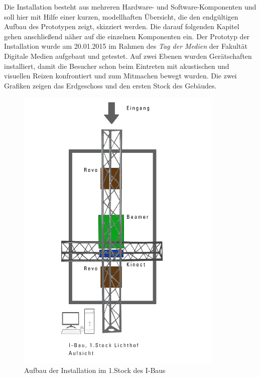 
Die Installation besteht aus mehreren Hardware- und Software-Komponenten und soll hier mit Hilfe einer kurzen, modellhaften Übersicht, die den endgültigen Aufbau des Prototypen zeigt, skizziert werden. Die darauf folgenden Kapitel gehen anschließend näher auf die einzelnen Komponenten ein. Der Prototyp der Installation wurde am 20.01.2015 im Rahmen des \textit{Tag der Medien} der Fakultät Digitale Medien aufgebaut und getestet. Auf zwei Ebenen wurden Gerätschaften installiert, damit die Besucher schon beim Eintreten mit akustischen und visuellen Reizen konfrontiert und zum Mitmachen bewegt wurden. Die zwei Grafiken zeigen das Erdgeschoss und den ersten Stock des Gebäudes.
\begin{figure}[htbp]
	\centering
		\includegraphics[width=0.88\textwidth]{images/ModelFirstFloor.png}
	\caption{Aufbau der Installation im 1.Stock des I-Baus}
	\label{fig:ModelFF}
\end{figure}


